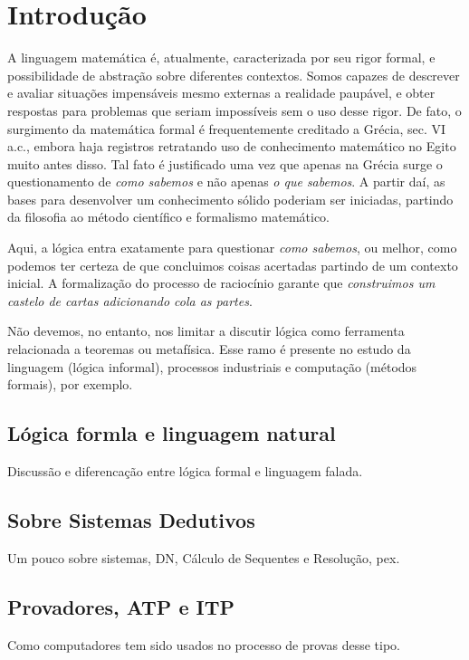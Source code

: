 \chapter{Introdução}

A linguagem matemática é, atualmente, caracterizada por seu rigor formal, e possibilidade de abstração sobre diferentes contextos. Somos capazes de descrever e avaliar situações impensáveis mesmo externas a realidade paupável, e obter respostas para problemas que seriam impossíveis sem o uso desse rigor. De fato, o surgimento da matemática formal é frequentemente creditado a Grécia, sec. VI a.c., embora haja registros retratando uso de conhecimento matemático no Egito muito antes disso. Tal fato é justificado uma vez que apenas na Grécia surge o questionamento de \textit{como sabemos} e não apenas \textit{o que sabemos}. A partir daí, as bases para desenvolver um conhecimento sólido poderiam ser iniciadas, partindo da filosofia ao método científico e formalismo matemático.

Aqui, a lógica entra exatamente para questionar \textit{como sabemos}, ou melhor, como podemos ter certeza de que concluimos coisas acertadas partindo de um contexto inicial. A formalização do processo de raciocínio garante que \textit{construimos um castelo de cartas adicionando cola as partes}.

Não devemos, no entanto, nos limitar a discutir lógica como ferramenta relacionada a teoremas ou metafísica. Esse ramo é presente no estudo da linguagem (lógica informal), processos industriais e computação (métodos formais), por exemplo. %

\section{Lógica formla e linguagem natural}
Discussão e diferencação entre lógica formal e linguagem falada.

\section{Sobre Sistemas Dedutivos}
Um pouco sobre sistemas, DN, Cálculo de Sequentes e Resolução, pex.

\section{Provadores, ATP e ITP}
Como computadores tem sido usados no processo de provas desse tipo.

